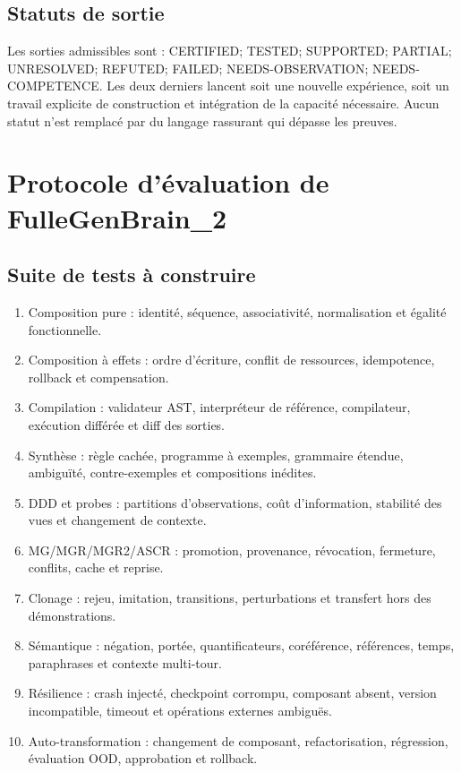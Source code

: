 \documentclass[11pt,a4paper]{article}
\newcommand{\State}[1]{\textsf{#1}}
\begin{document}
\subsection{Statuts de sortie}
Les sorties admissibles sont : \State{CERTIFIED}; \State{TESTED}; \State{SUPPORTED}; \State{PARTIAL}; \State{UNRESOLVED}; \State{REFUTED}; \State{FAILED}; \State{NEEDS-OBSERVATION}; \State{NEEDS-COMPETENCE}. Les deux derniers lancent soit une nouvelle expérience, soit un travail explicite de construction et intégration de la capacité nécessaire. Aucun statut n'est remplacé par du langage rassurant qui dépasse les preuves.

\section{Protocole d'évaluation de FulleGenBrain\_2}
\subsection{Suite de tests à construire}
\begin{enumerate}
\item Composition pure : identité, séquence, associativité, normalisation et égalité fonctionnelle.
\item Composition à effets : ordre d'écriture, conflit de ressources, idempotence, rollback et compensation.
\item Compilation : validateur AST, interpréteur de référence, compilateur, exécution différée et diff des sorties.
\item Synthèse : règle cachée, programme à exemples, grammaire étendue, ambiguïté, contre-exemples et compositions inédites.
\item DDD et probes : partitions d'observations, coût d'information, stabilité des vues et changement de contexte.
\item MG/MGR/MGR2/ASCR : promotion, provenance, révocation, fermeture, conflits, cache et reprise.
\item Clonage : rejeu, imitation, transitions, perturbations et transfert hors des démonstrations.
\item Sémantique : négation, portée, quantificateurs, coréférence, références, temps, paraphrases et contexte multi-tour.
\item Résilience : crash injecté, checkpoint corrompu, composant absent, version incompatible, timeout et opérations externes ambiguës.
\item Auto-transformation : changement de composant, refactorisation, régression, évaluation OOD, approbation et rollback.
\end{enumerate}
\end{document}
